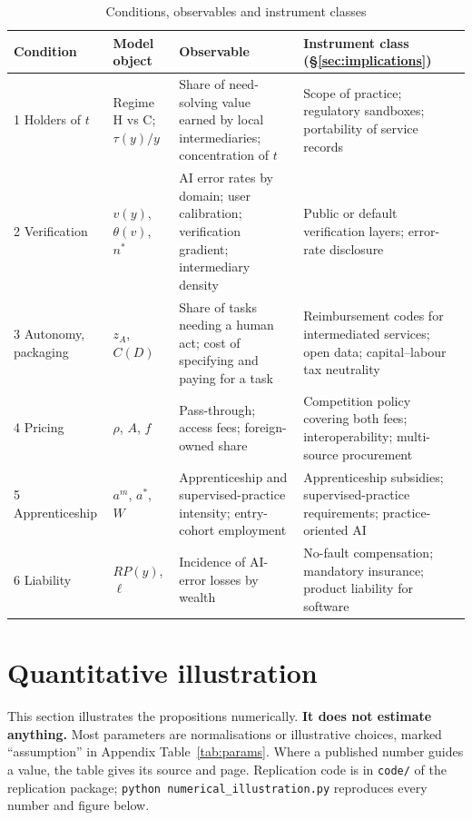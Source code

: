 \documentclass[12pt]{article}
\theoremstyle{remark}
\begin{document}
\begin{table}[t]\centering\small
\caption{Conditions, observables and instrument classes}\label{tab:conditions}
\begin{tabular}{p{}p{}p{}p{}}
\toprule
Condition & Model object & Observable & Instrument class (\S\ref{sec:implications})\\
\midrule
1 Holders of $t$ & Regime H vs C; $\tau(y)/y$ & Share of need-solving value earned by local intermediaries; concentration of $t$ & Scope of practice; regulatory sandboxes; portability of service records\\
2 Verification & $v(y)$, $\theta(v)$, $n^*$ & AI error rates by domain; user calibration; verification gradient; intermediary density & Public or default verification layers; error-rate disclosure\\
3 Autonomy, packaging & $z_A$, $C(D)$ & Share of tasks needing a human act; cost of specifying and paying for a task & Reimbursement codes for intermediated services; open data; capital--labour tax neutrality\\
4 Pricing & $\rho$, $A$, $f$ & Pass-through; access fees; foreign-owned share & Competition policy covering both fees; interoperability; multi-source procurement\\
5 Apprenticeship & $a^m$, $a^*$, $W$ & Apprenticeship and supervised-practice intensity; entry-cohort employment & Apprenticeship subsidies; supervised-practice requirements; practice-oriented AI\\
6 Liability & $RP(y)$, $\ell$ & Incidence of AI-error losses by wealth & No-fault compensation; mandatory insurance; product liability for software\\
\bottomrule
\end{tabular}
\end{table}

\section{Quantitative illustration}\label{sec:quant}

This section illustrates the propositions numerically. \textbf{It does not estimate anything.} Most parameters are normalisations or illustrative choices, marked ``assumption'' in Appendix Table~\ref{tab:params}. Where a published number guides a value, the table gives its source and page. Replication code is in \texttt{code/} of the replication package; \texttt{python numerical\_illustration.py} reproduces every number and figure below.
\end{document}
